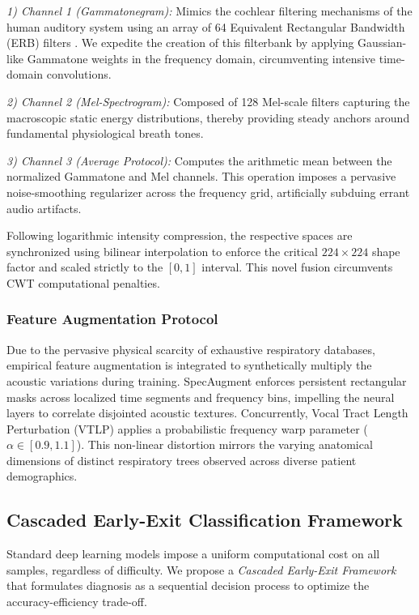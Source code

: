\textit{1) Channel 1 (Gammatonegram):} Mimics the cochlear filtering mechanisms of the human auditory system using an array of 64 Equivalent Rectangular Bandwidth (ERB) filters \cite{b28}. We expedite the creation of this filterbank by applying Gaussian-like Gammatone weights in the frequency domain, circumventing intensive time-domain convolutions. 

\textit{2) Channel 2 (Mel-Spectrogram):} Composed of 128 Mel-scale filters capturing the macroscopic static energy distributions, thereby providing steady anchors around fundamental physiological breath tones.

\textit{3) Channel 3 (Average Protocol):} Computes the arithmetic mean between the normalized Gammatone and Mel channels. This operation imposes a pervasive noise-smoothing regularizer across the frequency grid, artificially subduing errant audio artifacts.

Following logarithmic intensity compression, the respective spaces are synchronized using bilinear interpolation to enforce the critical $224 \times 224$ shape factor and scaled strictly to the $[0, 1]$ interval. This novel fusion circumvents CWT computational penalties.

\subsubsection{Feature Augmentation Protocol}
Due to the pervasive physical scarcity of exhaustive respiratory databases, empirical feature augmentation is integrated to synthetically multiply the acoustic variations during training. SpecAugment enforces persistent rectangular masks across localized time segments and frequency bins, impelling the neural layers to correlate disjointed acoustic textures. Concurrently, Vocal Tract Length Perturbation (VTLP) applies a probabilistic frequency warp parameter ($\alpha \in [0.9, 1.1]$). This non-linear distortion mirrors the varying anatomical dimensions of distinct respiratory trees observed across diverse patient demographics.

\subsection{Cascaded Early-Exit Classification Framework}
\label{subsec:architecture}
Standard deep learning models impose a uniform computational cost on all samples, regardless of difficulty. We propose a \textit{Cascaded Early-Exit Framework} that formulates diagnosis as a sequential decision process to optimize the accuracy-efficiency trade-off.

